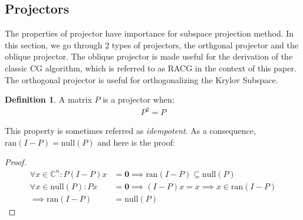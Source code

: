 \documentclass[]{article}
\theoremstyle{definition}
\newtheorem{definition}{Definition}
\begin{document}
    \subsection{Projectors}
        The properties of projector have importance for subspace projection method. In this section, we go through 2 types of projectors, the orthgonal projector and the oblique projector. The oblique projector is made useful for the derivation of the classic CG algorithm, which is referred to as RACG in the context of this paper. The orthogonal projector is useful for orthogonalizing the Krylov Subspace. 
        \begin{definition}
            A matrix $P$ is a projector when: 
            \begin{align}
                P^2 = P
            \end{align}    
        \end{definition}
        This property is sometimes referred as \textit{idempotent}. As a consequence, $\text{ran}(I - P) = \text{null}(P)$ and here is the proof: 
        \begin{proof}
            \begin{align}
                \forall x \in \mathbb{C}^n: P(I - P)x &= \mathbf{0} \implies \text{ran}(I - P)\subseteq \text{null}(P)
                \\
                \forall x \in \text{null}(P): Px &= \mathbf{0} \implies (I - P)x = x \implies x \in \text{ran}(I - P)
                \\
                \implies \text{ran}(I - P) &= \text{null}(P)
                \label{3.1.4}
            \end{align}
        \end{proof}
        \noindent
\end{document}
